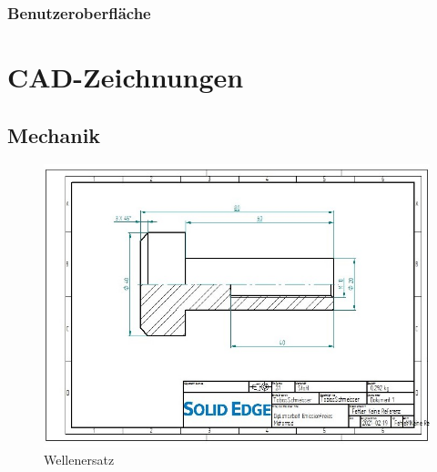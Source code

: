 \subsection{Benutzeroberfläche}


\chapter{CAD-Zeichnungen}

\newpage

\section{Mechanik}

\begin{figure} [H]
	\begin{center}
		\includegraphics[angle=90, scale=0.9] {figures/mechanik/Welle_Rechts_Zeichnung.jpg}
		\caption{Wellenersatz}
		\label{fig:Wellenersatz1}
	\end{center}
\end{figure}


\newpage

